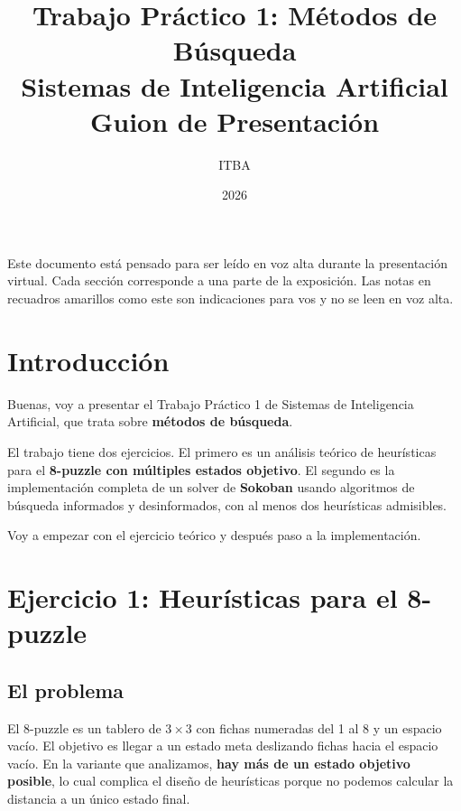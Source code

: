 \documentclass[12pt, a4paper]{article}
\title{
  \textbf{Trabajo Práctico 1: Métodos de Búsqueda} \\[0.3cm]
  \large Sistemas de Inteligencia Artificial \\[0.2cm]
  \normalsize Guion de Presentación
}
\author{ITBA}
\date{2026}
\begin{document}
\maketitle
\thispagestyle{empty}

\begin{notapresentador}
Este documento está pensado para ser leído en voz alta durante la presentación virtual. Cada sección corresponde a una parte de la exposición. Las notas en recuadros amarillos como este son indicaciones para vos y no se leen en voz alta.
\end{notapresentador}

\newpage
\tableofcontents
\newpage

\section{Introducción}

Buenas, voy a presentar el Trabajo Práctico 1 de Sistemas de Inteligencia Artificial, que trata sobre \textbf{métodos de búsqueda}.

El trabajo tiene dos ejercicios. El primero es un análisis teórico de heurísticas para el \textbf{8-puzzle con múltiples estados objetivo}. El segundo es la implementación completa de un solver de \textbf{Sokoban} usando algoritmos de búsqueda informados y desinformados, con al menos dos heurísticas admisibles.

Voy a empezar con el ejercicio teórico y después paso a la implementación.

\section{Ejercicio 1: Heurísticas para el 8-puzzle}

\subsection{El problema}

El 8-puzzle es un tablero de $3 \times 3$ con fichas numeradas del 1 al 8 y un espacio vacío. El objetivo es llegar a un estado meta deslizando fichas hacia el espacio vacío. En la variante que analizamos, \textbf{hay más de un estado objetivo posible}, lo cual complica el diseño de heurísticas porque no podemos calcular la distancia a un único estado final.
\end{document}
